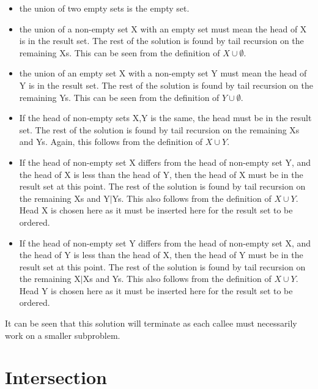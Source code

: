 \documentclass[]{article}
\begin{document}
\begin{itemize}
	\item the union of two empty sets is the empty set.
	
	\item the union of a non-empty set X with an empty set must mean the head of X is in the result set. The rest of the solution is found by tail recursion on the remaining Xs. This can be seen from the definition of $X \cup \emptyset$.
	
	\item the union of an empty set X with a non-empty set Y must mean the head of Y is in the result set. The rest of the solution is found by tail recursion on the remaining Ys. This can be seen from the definition of $Y \cup \emptyset$.
	
	\item If the head of non-empty sets X,Y is the same, the head must be in the result set. The rest of the solution is found by tail recursion on the remaining Xs and Ys. Again, this follows from the definition of $X \cup Y$.
	
	\item If the head of non-empty set X differs from the head of non-empty set Y, and the head of X is less than the head of Y, then the head of X must be in the result set at this point. The rest of the solution is found by tail recursion on the remaining Xs and Y$|$Ys. This also follows from the definition of $X \cup Y$. Head X is chosen here as it must be inserted here for the result set to be ordered. 
	
	\item If the head of non-empty set Y differs from the head of non-empty set X, and the head of Y is less than the head of X, then the head of Y must be in the result set at this point. The rest of the solution is found by tail recursion on the remaining X$|$Xs and Ys. This also follows from the definition of $X \cup Y$. Head Y is chosen here as it must be inserted here for the result set to be ordered.  

\end{itemize}

It can be seen that this solution will terminate as each callee must necessarily work on a smaller subproblem.\par   

\section{Intersection} %
\label{sec:intersection}
\end{document}
